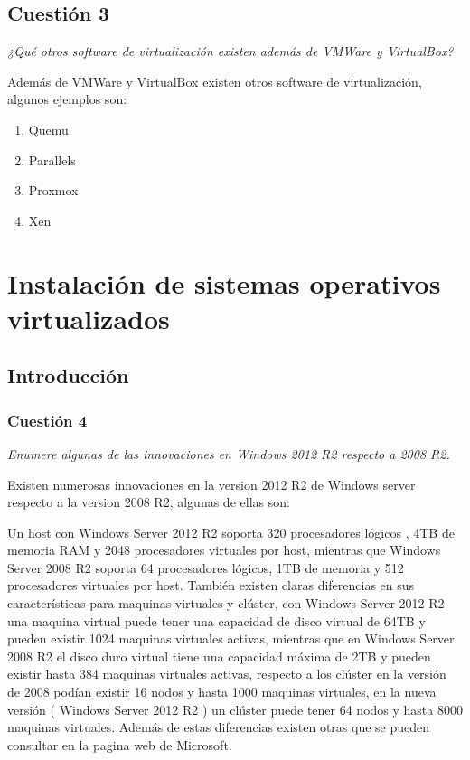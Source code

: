 \subsection{Cuestión 3} 

\textit{¿Qué otros software de virtualización existen además de VMWare y VirtualBox?} \newline

Además de  VMWare y VirtualBox existen otros software de virtualización, algunos ejemplos son:
\begin{enumerate}
    \item Quemu \cite{quemu}
    \item Parallels \cite{parallels}
    \item Proxmox \cite{proxmox}
    \item Xen \cite{xen}
\end{enumerate}

\section{Instalación de sistemas operativos virtualizados}
\subsection{Introducción}
\subsubsection{Cuestión 4}
\textit{Enumere algunas de las innovaciones en Windows 2012 R2 respecto a 2008 R2.} \newline

Existen numerosas innovaciones en la version 2012 R2 de Windows server respecto a la version 2008 R2, algunas de ellas son:

Un host con Windows Server 2012 R2 soporta 320 procesadores lógicos , 4TB de memoria RAM y 2048 procesadores virtuales por host, mientras que Windows Server 2008 R2 soporta 64 procesadores lógicos, 1TB de memoria y 512 procesadores virtuales por host. También existen claras diferencias en sus características para maquinas virtuales y clúster, con Windows Server 2012 R2 una maquina virtual puede tener una capacidad de disco virtual de 64TB y pueden existir 1024 maquinas virtuales activas, mientras que en Windows Server 2008 R2 el disco duro virtual tiene una capacidad máxima de 2TB y pueden existir hasta 384 maquinas virtuales activas, respecto a los clúster en la versión de 2008 podían existir 16 nodos y hasta 1000 maquinas virtuales, en la nueva versión ( Windows Server 2012 R2 ) un clúster puede tener 64 nodos y hasta 8000 maquinas virtuales. Además de estas diferencias existen otras que se pueden consultar en la pagina web de Microsoft. \cite{2008vs2012}


